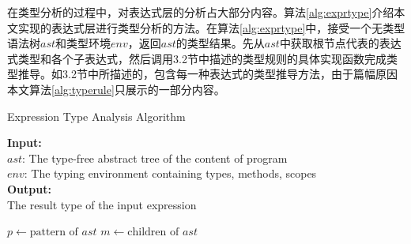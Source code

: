 在类型分析的过程中，对表达式层的分析占大部分内容。算法\ref{alg:exprtype}介绍本文实现的表达式层进行类型分析的方法。在算法\ref{alg:exprtype}中，接受一个无类型语法树$ast$和类型环境$env$，返回$ast$的类型结果。先从$ast$中获取根节点代表的表达式类型和各个子表达式，然后调用3.2节中描述的类型规则的具体实现函数完成类型推导。如3.2节中所描述的，包含每一种表达式的类型推导方法，由于篇幅原因本文算法\ref{alg:typerule}只展示的一部分内容。
\begin{algorithm}[!htbp]
    \small
    \caption{Expression Type Analysis Algorithm}\label{alg:exprtype}
    \hspace*{0.02in} {\bf Input:} \\
	\hspace*{0.04in} $ast$: The type-free abstract tree of the content of program \\
	\hspace*{0.04in} $env$: The typing environment containing types, methods, scopes \\
	\hspace*{0.02in} {\bf Output:} \\
	\hspace*{0.04in} The result type of the input expression
    \begin{algorithmic}[1]
        \State $p\gets \text{pattern of } ast$ 
        \State $m\gets \text{children of } ast$ 
        \State \Return {} 
        \EndProcedure
    \end{algorithmic}
\end{algorithm}

